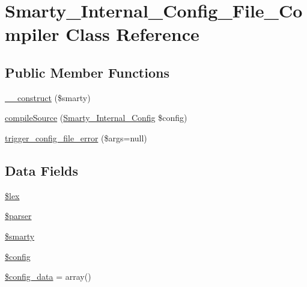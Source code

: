 \hypertarget{class_smarty___internal___config___file___compiler}{}\section{Smarty\+\_\+\+Internal\+\_\+\+Config\+\_\+\+File\+\_\+\+Compiler Class Reference}
\label{class_smarty___internal___config___file___compiler}
\subsection*{Public Member Functions}
\begin{DoxyCompactItemize}
\item 
\hyperlink{class_smarty___internal___config___file___compiler_a7913fd4038ea6c7d99e49bd3ba9028ca}{\+\_\+\+\_\+construct} (\$smarty)
\item 
\hyperlink{class_smarty___internal___config___file___compiler_a707ebfe4f062abbef71f104a757705e6}{compile\+Source} (\hyperlink{class_smarty___internal___config}{Smarty\+\_\+\+Internal\+\_\+\+Config} \$config)
\item 
\hyperlink{class_smarty___internal___config___file___compiler_a5c8dae2b6dac3dff4ba1b12c4994183f}{trigger\+\_\+config\+\_\+file\+\_\+error} (\$args=null)
\end{DoxyCompactItemize}
\subsection*{Data Fields}
\begin{DoxyCompactItemize}
\item 
\hyperlink{class_smarty___internal___config___file___compiler_aca825068998c07781f4d7cbfe46b86a2}{\$lex}
\item 
\hyperlink{class_smarty___internal___config___file___compiler_a147a766daa03d52576c7345fea31c945}{\$parser}
\item 
\hyperlink{class_smarty___internal___config___file___compiler_ac3ae29e9ccbb2006fa26fd9eb2c12117}{\$smarty}
\item 
\hyperlink{class_smarty___internal___config___file___compiler_a49c7011be9c979d9174c52a8b83e5d8e}{\$config}
\item 
\hyperlink{class_smarty___internal___config___file___compiler_a36ca7cb4b0caa99d9cdf4a47545945c0}{\$config\+\_\+data} = array()
\end{DoxyCompactItemize}


